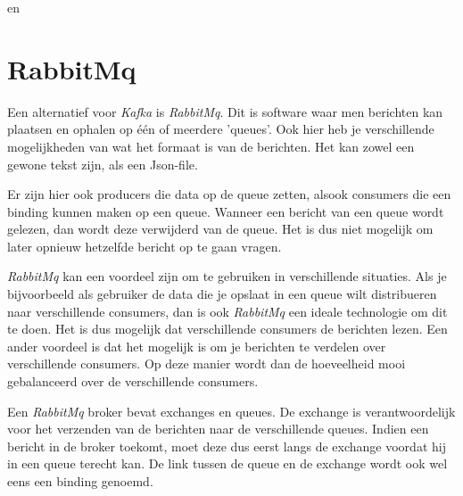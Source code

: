 \autocite{Sookocheff2015} en \autocite{Johansson2016}

\section{RabbitMq}

Een alternatief voor \emph{Kafka} is \emph{RabbitMq}. Dit is software waar men berichten kan plaatsen en ophalen op één of meerdere 'queues'. Ook hier heb je verschillende mogelijkheden van wat het formaat is van de berichten. Het kan zowel een gewone tekst zijn, als een Json-file. 

Er zijn hier ook producers die data op de queue zetten, alsook consumers die een binding kunnen maken op een queue. Wanneer een bericht van een queue wordt gelezen, dan wordt deze verwijderd van de queue. Het is dus niet mogelijk om later opnieuw hetzelfde bericht op te gaan vragen. 

\emph{RabbitMq} kan een voordeel zijn om te gebruiken in verschillende situaties. Als je bijvoorbeeld als gebruiker de data die je opslaat in een queue wilt distribueren naar verschillende consumers, dan is ook \emph{RabbitMq} een ideale technologie om dit te doen. Het is dus mogelijk dat verschillende consumers de berichten lezen. Een ander voordeel is dat het mogelijk is om je berichten te verdelen over verschillende consumers. Op deze manier wordt dan de hoeveelheid mooi gebalanceerd over de verschillende consumers.

Een \emph{RabbitMq} broker bevat exchanges en queues. De exchange is verantwoordelijk voor het verzenden van de berichten naar de verschillende queues. Indien een bericht in de broker toekomt, moet deze dus eerst langs de exchange voordat hij in een queue terecht kan. De link tussen de queue en de exchange wordt ook wel eens een binding genoemd.

